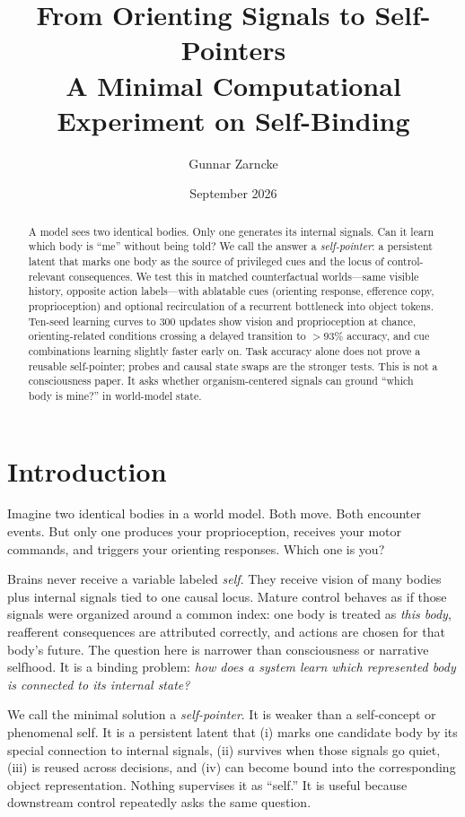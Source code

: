 \documentclass[11pt]{article}
\title{\textbf{From Orienting Signals to Self-Pointers}\\
\large A Minimal Computational Experiment on Self-Binding}
\author{Gunnar Zarncke}
\date{September 2026}
\begin{document}
\maketitle

\begin{abstract}
A model sees two identical bodies. Only one generates its internal signals. Can it learn which body is ``me'' without being told? We call the answer a \emph{self-pointer}: a persistent latent that marks one body as the source of privileged cues and the locus of control-relevant consequences. We test this in matched counterfactual worlds---same visible history, opposite action labels---with ablatable cues (orienting response, efference copy, proprioception) and optional recirculation of a recurrent bottleneck into object tokens. Ten-seed learning curves to 300 updates show vision and proprioception at chance, orienting-related conditions crossing a delayed transition to ${>}93\%$ accuracy, and cue combinations learning slightly faster early on. Task accuracy alone does not prove a reusable self-pointer; probes and causal state swaps are the stronger tests. This is not a consciousness paper. It asks whether organism-centered signals can ground ``which body is mine?'' in world-model state.
\end{abstract}

\section{Introduction}

Imagine two identical bodies in a world model. Both move. Both encounter events. But only one produces your proprioception, receives your motor commands, and triggers your orienting responses. Which one is you?

Brains never receive a variable labeled \emph{self}. They receive vision of many bodies plus internal signals tied to one causal locus. Mature control behaves as if those signals were organized around a common index: one body is treated as \emph{this body}, reafferent consequences are attributed correctly, and actions are chosen for that body's future. The question here is narrower than consciousness or narrative selfhood. It is a binding problem: \emph{how does a system learn which represented body is connected to its internal state?}

We call the minimal solution a \emph{self-pointer}. It is weaker than a self-concept or phenomenal self. It is a persistent latent that (i) marks one candidate body by its special connection to internal signals, (ii) survives when those signals go quiet, (iii) is reused across decisions, and (iv) can become bound into the corresponding object representation. Nothing supervises it as ``self.'' It is useful because downstream control repeatedly asks the same question.
\end{document}
